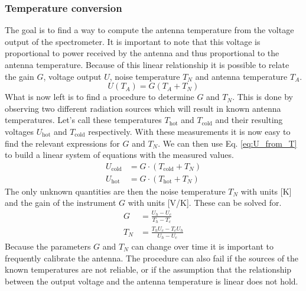 \subsubsection{Temperature conversion}\label{sec:antenna_temp}
The goal is to find a way to compute the antenna temperature from the voltage output of the spectrometer.
It is important to note that this voltage is proportional to power received by the antenna and thus proportional to the antenna temperature.
Because of this linear relationship it is possible to relate the gain $G$, voltage output $U$, noise temperature $T_N$ and antenna temperature $T_A$. \cite[Eq. (5)]{srt}
\begin{equation}
    U(T_A) = G(T_A + T_N) \label{eq:U_from_T}
\end{equation}
What is now left is to find a procedure to determine $G$ and $T_N$. This is done by observing two different radiation sources which will result in known antenna temperatures. Let's call these temperatures $T_\text{hot}$ and $T_\text{cold}$ and their resulting voltages $U_\text{hot}$ and $T_\text{cold}$ respectively.
With these measurements it is now easy to find the relevant expressions for $G$ and $T_N$.
We can then use Eq. \eqref{eq:U_from_T} to build a linear system of equations with the measured values.
\begin{equation} \label{eq:P_to_Ta_sys}
	\begin{split}
		U_\text{cold} &= G \cdot (T_\text{cold} + T_N) \\
		U_\text{hot} &= G \cdot (T_\text{hot} + T_N)
	\end{split}
\end{equation}
The only unknown quantities are then the noise temperature $T_N$ with units [K] and the gain of the instrument $G$ with units [V/K].
These can be solved for.
\begin{align}
	G &= \frac{U_h-U_c}{T_h-T_c}\label{eq:G}\\
	T_N &= \frac{T_h U_c-T_c U_h}{U_h-U_c}\label{eq:TN}
\end{align}
Because the parameters $G$ and $T_N$ can change over time it is important to frequently calibrate the antenna. The procedure can also fail if the sources of the known temperatures are not reliable, or if the assumption that the relationship between the output voltage and the antenna temperature is linear does not hold.

